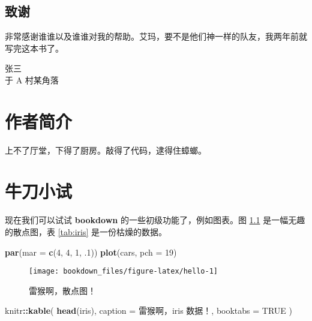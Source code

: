 \documentclass[]{ctexbook}
\newenvironment{Shaded}{\begin{snugshade}}{\end{snugshade}}
\newcommand{\DataTypeTok}[1]{\textcolor[rgb]{0.13,0.29,0.53}{#1}}
\newcommand{\DecValTok}[1]{\textcolor[rgb]{0.00,0.00,0.81}{#1}}
\newcommand{\FloatTok}[1]{\textcolor[rgb]{0.00,0.00,0.81}{#1}}
\newcommand{\KeywordTok}[1]{\textcolor[rgb]{0.13,0.29,0.53}{\textbf{#1}}}
\newcommand{\NormalTok}[1]{#1}
\newcommand{\OperatorTok}[1]{\textcolor[rgb]{0.81,0.36,0.00}{\textbf{#1}}}
\newcommand{\OtherTok}[1]{\textcolor[rgb]{0.56,0.35,0.01}{#1}}
\newcommand{\StringTok}[1]{\textcolor[rgb]{0.31,0.60,0.02}{#1}}
\let\BeginKnitrBlock\begin \let\EndKnitrBlock\end
\begin{document}
\hypertarget{ux81f4ux8c22}{%
\section*{致谢}\label{ux81f4ux8c22}}


非常感谢谁谁以及谁谁对我的帮助。艾玛，要不是他们神一样的队友，我两年前就写完这本书了。

\BeginKnitrBlock{flushright}
张三\\
于 A 村某角落
\EndKnitrBlock{flushright}

\hypertarget{author}{%
\chapter*{作者简介}\label{author}}


上不了厅堂，下得了厨房。敲得了代码，逮得住蟑螂。

\mainmatter

\hypertarget{intro}{%
\chapter{牛刀小试}\label{intro}}

现在我们可以试试 \textbf{bookdown} 的一些初级功能了，例如图表。图 \ref{fig:hello} 是一幅无趣的散点图，表 \ref{tab:iris} 是一份枯燥的数据。

\begin{Shaded}
\begin{Highlighting}[]
\KeywordTok{par}\NormalTok{(}\DataTypeTok{mar =} \KeywordTok{c}\NormalTok{(}\DecValTok{4}\NormalTok{, }\DecValTok{4}\NormalTok{, }\DecValTok{1}\NormalTok{, }\FloatTok{.1}\NormalTok{))}
\KeywordTok{plot}\NormalTok{(cars, }\DataTypeTok{pch =} \DecValTok{19}\NormalTok{)}
\end{Highlighting}
\end{Shaded}

\begin{figure}
\texttt{[image: bookdown\_files/figure-latex/hello-1]} \caption{雷猴啊，散点图！}\label{fig:hello}
\end{figure}

\begin{Shaded}
\begin{Highlighting}[]
\NormalTok{knitr}\OperatorTok{::}\KeywordTok{kable}\NormalTok{(}
  \KeywordTok{head}\NormalTok{(iris), }\DataTypeTok{caption =} \StringTok{\textquotesingle{}雷猴啊，iris 数据！\textquotesingle{}}\NormalTok{,}
  \DataTypeTok{booktabs =} \OtherTok{TRUE}
\NormalTok{)}
\end{Highlighting}
\end{Shaded}
\end{document}
